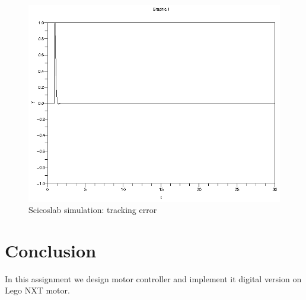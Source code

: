 \documentclass[a4paper,12pt,oneside]{article}
\begin{document}
\begin{figure}
	\centering
	\includegraphics[width=\columnwidth]{../controler/tracking_err.eps}
	\caption{Scicoslab simulation: tracking error}
	\label{fig:simulation_tracking_err}
\end{figure}

\section{Conclusion}
In this assignment we design motor controller and implement it digital version on Lego NXT motor.
\end{document}
